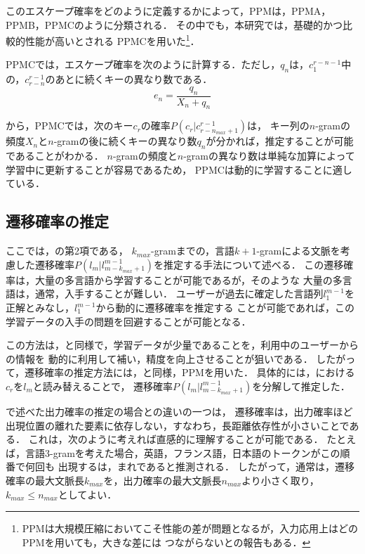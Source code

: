 \documentclass[japanese]{jnlp_1.4}
\newcommand{\secref}[1]{}
\renewcommand{\eqref}[1]{}
\renewcommand{\text}{}
\begin{document}
このエスケープ確率をどのように定義するかによって，PPMは，PPMA，PPMB，PPMCのように分類される．
その中でも，本研究では，基礎的かつ比較的性能が高いとされる
PPMCを用いた\footnote{ PPMは大規模圧縮においてこそ性能の差が問題となるが，入力応用上はどのPPMを用いても，大きな差には
つながらないとの報告もある\cite{nle06}．}\cite{textcomp}．


PPMCでは，エスケープ確率を次のように計算する．ただし，$q_n$は，$c_1^{r-n-1}$中の，$c_{r-n}^{r-1}$のあとに続くキーの異なり数である．
\begin{equation} 
  e_n = \frac{q_n}{X_n+q_n} \label{eq:PPMC}
\end{equation} 

\eqref{eq:PPMC}から，PPMCでは，次のキー$c_r$の確率$P(c_r|c_{r-n_{max}+1}^{r-1})$は，
キー列の$n$-gramの頻度$X_n$と$n$-gramの後に続くキーの異なり数$q_n$が分かれば，推定することが可能であることがわかる．
$n$-gramの頻度と$n$-gramの異なり数は単純な加算によって学習中に更新することが容易であるため，
PPMCは動的に学習することに適している．


\subsection{遷移確率の推定} 
\label{sec:trans}

ここでは，\eqref{eq:approx}の第2項である，
$k_{max}$-gramまでの，言語$k+1$-gramによる文脈を考慮した遷移確率$P(l_m|l_{m-k_{max}+1}^{m-1})$を推定する手法について述べる．
この遷移確率は，大量の多言語{\text}から学習することが可能であるが，そのような
大量の多言語{\text}は，通常，入手することが難しい．
ユーザーが過去に確定した言語列$l_1^{m-1}$を正解とみなし，$l_1^{m-1}$から動的に遷移確率を推定する
ことが可能であれば，この学習データの入手の問題を回避することが可能となる．

この方法は，\secref{sec:output}と同様で，学習データが少量であることを，利用中のユーザーからの情報を
動的に利用して補い，精度を向上させることが狙いである．
したがって，遷移確率の推定方法には，\secref{sec:output}と同様，PPMを用いた．
具体的には，\eqref{eq:weights}における$c_r$を$l_m$と読み替えることで，
遷移確率$P(l_m|l_{m-k_{max}+1}^{m-1})$を分解して推定した．

\secref{sec:output}で述べた出力確率の推定の場合との違いの一つは，
遷移確率は，出力確率ほど出現位置の離れた要素に依存しない，すなわち，長距離依存性が小さいことである．
これは，次のように考えれば直感的に理解することが可能である．
たとえば，言語3-gramを考えた場合，英語，フランス語，日本語のトークンがこの順番で何回も
出現する{\text}は，まれであると推測される．
したがって，通常は，遷移確率の最大文脈長$k_{max}$を，出力確率の最大文脈長$n_{max}$より小さく取り，
$k_{max} \le n_{max}$としてよい．
\end{document}
